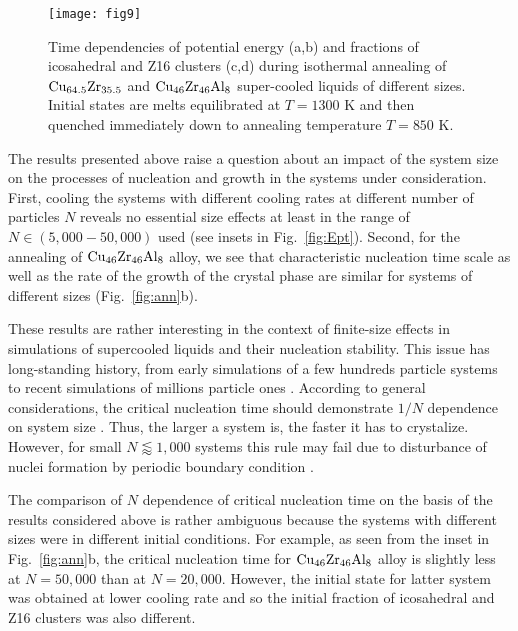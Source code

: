 \documentclass[jcp,twocolumn,superscriptaddress,floatfix,graphicx,showpacs]{revtex4-1}
\begin{document}
 \begin{figure}
  \centering
  \texttt{[image: fig9]}\\
  \caption{Time dependencies of potential energy (a,b) and fractions of icosahedral and Z16 clusters (c,d) during isothermal annealing of ${\rm Cu_{64.5}Zr_{35.5}}$ and ${\rm Cu_{46}Zr_{46}Al_{8}}$ super-cooled liquids of different sizes. Initial states are melts equilibrated at $T=1300$ K and then quenched immediately down to annealing temperature $T=850$ K.}
   \label{fig:ann3}
\end{figure}

The results presented above raise a question about an impact of the system size on the processes of nucleation and growth in the systems under consideration. First, cooling the systems with different cooling rates at different number of particles $N$ reveals no essential size effects at least in the range of $N\in (5,000 -50,000)$ used (see insets in Fig.~\ref{fig:Ept}). Second, for the annealing of ${\rm Cu_{46}Zr_{46}Al_{8}}$ alloy, we see that characteristic nucleation time scale as well as the rate of the growth of the crystal phase are similar for systems of different sizes (Fig.~\ref{fig:ann}b).

These results are rather interesting in the context of finite-size effects in simulations of supercooled liquids and their nucleation stability. This issue has long-standing history, from early simulations of a few hundreds particle systems to recent simulations of millions particle ones \cite{Mandell1977JCP,Honeycutt1986JPC,Swope1990PRB,Streitz2006PRB}. According to general considerations, the critical nucleation time should demonstrate $1/N$ dependence on system size \cite{Honeycutt1986JPC}. Thus, the larger a system is, the faster it has to crystalize.  However, for small $N \lessapprox 1,000$ systems this rule may fail due to disturbance of nuclei formation by periodic boundary condition \cite{Honeycutt1986JPC}.

The comparison of $N$ dependence of critical nucleation time on the basis of the results considered above is rather ambiguous because the systems with different sizes were in different initial conditions. For example, as seen from the inset in Fig.~\ref{fig:ann}b, the critical nucleation time for ${\rm Cu_{46}Zr_{46}Al_{8}}$ alloy is slightly less at $N=50,000$ than at $N=20,000$. However, the initial state for latter system was obtained at lower cooling rate and so the initial fraction of icosahedral and Z16 clusters was also different.
\end{document}
